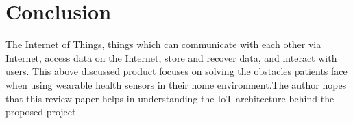 \documentclass{jpp}
\begin{document}
\section{Conclusion} 
The Internet of Things, things which can communicate with each other via Internet, access data on the Internet, store and recover data, and interact with users. This above discussed product focuses on solving the obstacles patients face when using wearable health sensors in their home environment.The author hopes that this review paper helps in understanding the IoT architecture behind the proposed project.
\end{document}
